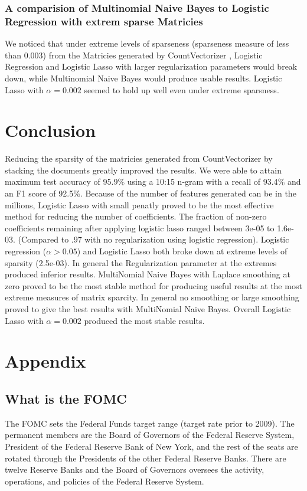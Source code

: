 \documentclass[11pt]{article}
\begin{document}
{\subsubsection{A comparision of Multinomial Naive Bayes to Logistic Regression with extrem sparse Matricies}
We noticed that under extreme levels of sparseness (sparseness measure of less than $0.003$) from the Matricies 
generated by CountVectorizer , Logistic Regression and Logistic Lasso with larger regularization parameters would break down, 
while Multinomial Naive Bayes would produce usable results. Logistic Lasso with $\alpha=0.002$ seemed to hold up
well even under extreme sparsness.


\section{Conclusion}
Reducing the sparsity of the matricies generated from CountVectorizer by stacking the documents greatly improved the results.
We were able to attain maximum test accuracy of 95.9$\%$ using a 10:15 n-gram with a recall of 93.4$\%$ and an F1 score of 92.5$\%$.
Because of the number of features generated can be in the millions, Logistic Lasso with small penatly proved to be the most effective 
method for reducing the number of coefficients.
The fraction of non-zero coefficients remaining after applying logistic lasso
ranged between 3e-05 to 1.6e-03.  (Compared to .97 with no regularization using logistic regression).
Logistic regression ($\alpha > 0.05$) and Logistic Lasso both broke down at extreme levels of sparsity 
(2.5e-03).
In general the Regularization parameter at the extremes produced inferior results.
MultiNomial Naive Bayes with Laplace smoothing at zero proved to be the most stable method for producing useful results at the
most extreme measures of matrix sparcity.  In general no smoothing or large smoothing proved to give the best results with
MultiNomial Naive Bayes. Overall Logistic Lasso with $\alpha = 0.002$ produced the most stable results.

\appendix
\section{Appendix}

\subsection{What is the FOMC}

The FOMC sets the Federal Funds target range (target rate prior to 2009).  The permanent members are the Board of Governors of the Federal Reserve System, President of the Federal Reserve Bank of New York, and the rest of the seats are rotated through the Presidents of the other Federal Reserve Banks.  There are twelve Reserve Banks and the Board of Governors oversees the activity, operations, and policies of the Federal Reserve System.   

}
\end{document}
